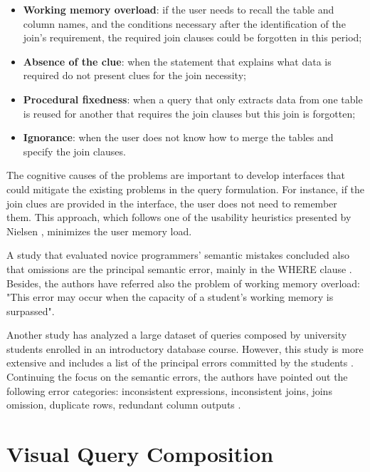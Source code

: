 \begin{itemize}
  \item \textbf{Working memory overload}: if the user needs to recall the table and column names, and the conditions necessary after the identification of the join's requirement, the required join clauses could be forgotten in this period;
  \item \textbf{Absence of the clue}: when the statement that explains what data is required do not present clues for the join necessity;
  \item \textbf{Procedural fixedness}: when a query that only extracts data from one table is reused for another that requires the join clauses but this join is forgotten;
  \item \textbf{Ignorance}:  when the user does not know how to merge the tables and specify the join clauses.
\end{itemize}

The cognitive causes of the problems are important to develop interfaces that could mitigate the existing problems in the query formulation. For instance, if the join clues are provided in the interface, the user does not need to remember them. This approach, which follows one of the usability heuristics presented by Nielsen \cite{usabilityEngineering}, minimizes the user memory load.

A study that evaluated novice programmers' semantic mistakes concluded also that omissions are the principal semantic error, mainly in the WHERE clause \cite{studentsSemanticMistakesInWritingSevenDifferentTypesOfSQLQueries}. Besides, the authors have referred also the problem of working memory overload: "This error may occur when the capacity of a student’s working memory is surpassed".

Another study has analyzed a large dataset of queries composed by university students enrolled in an introductory database course. However, this study is more extensive and includes a list of the principal errors committed by the students \cite{errorsAndComplicationsInSQLQueryFormulation}. Continuing the focus on the semantic errors, the authors have pointed out the following error categories: inconsistent expressions, inconsistent joins, joins omission, duplicate rows, redundant column outputs \cite{errorsAndComplicationsInSQLQueryFormulation}.

\section{Visual Query Composition}
\label{sec:visual_query_composition}

